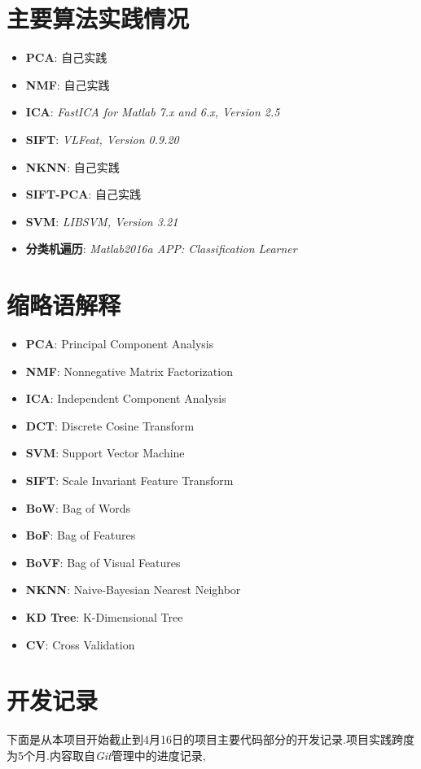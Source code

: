 \chapter{主要算法实践情况}
\begin{itemize}
	\item \textbf{PCA}: 自己实践
	\item \textbf{NMF}: 自己实践
	\item \textbf{ICA}: \textit{FastICA for Matlab 7.x and 6.x, Version 2.5}
	\item \textbf{SIFT}: \textit{VLFeat, Version 0.9.20}
	\item \textbf{NKNN}: 自己实践
	\item \textbf{SIFT-PCA}: 自己实践
	\item \textbf{SVM}: \textit{LIBSVM, Version 3.21}
	\item \textbf{分类机遍历}: \textit{Matlab2016a APP: Classification Learner}
\end{itemize}

\chapter{缩略语解释}
\begin{itemize}
	\item \textbf{PCA}: Principal Component Analysis
	\item \textbf{NMF}: Nonnegative Matrix Factorization
	\item \textbf{ICA}: Independent Component Analysis
	\item \textbf{DCT}: Discrete Cosine Transform
	\item \textbf{SVM}: Support Vector Machine
	\item \textbf{SIFT}: Scale Invariant Feature Transform
	\item \textbf{BoW}: Bag of Words
	\item \textbf{BoF}: Bag of Features
	\item \textbf{BoVF}: Bag of Visual Features 
	\item \textbf{NKNN}: Naive-Bayesian Nearest Neighbor
	\item \textbf{KD Tree}: K-Dimensional Tree
	\item \textbf{CV}: Cross Validation
\end{itemize}

\chapter{开发记录}
下面是从本项目开始截止到4月16日的项目主要代码部分的开发记录.项目实践跨度为5个月.内容取自\textit{Git}管理中的进度记录,




\listoftables
{}%
\listoffigures%

